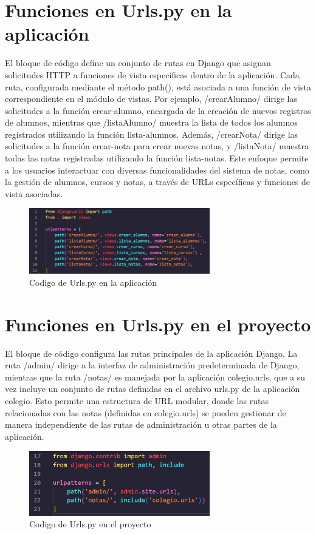 \documentclass[10pt, a4paper]{article}
\begin{document}
\section{Funciones en Urls.py en la aplicación}
El bloque de código define un conjunto de rutas en Django que asignan solicitudes HTTP a funciones de vista específicas dentro de la aplicación. Cada ruta, configurada mediante el método path(), está asociada a una función de vista correspondiente en el módulo de vistas. Por ejemplo, /crearAlumno/ dirige las solicitudes a la función crear-alumno, encargada de la creación de nuevos registros de alumnos, mientras que /listaAlumno/ muestra la lista de todos los alumnos registrados utilizando la función lista-alumnos. Además, /crearNota/ dirige las solicitudes a la función crear-nota para crear nuevas notas, y /listaNota/ muestra todas las notas registradas utilizando la función lista-notas. Este enfoque permite a los usuarios interactuar con diversas funcionalidades del sistema de notas, como la gestión de alumnos, cursos y notas, a través de URLs específicas y funciones de vista asociadas.
\begin{figure}[H]
  \centering
  \includegraphics[width=0.7\textwidth]{img/imagen5.jpeg}
  \caption{Codigo de Urls.py en la aplicación}
\end{figure} 

\section{Funciones en Urls.py en el proyecto}
El bloque de código configura las rutas principales de la aplicación Django. La ruta /admin/ dirige a la interfaz de administración predeterminada de Django, mientras que la ruta /notas/ es manejada por la aplicación colegio.urls, que a su vez incluye un conjunto de rutas definidas en el archivo urls.py de la aplicación colegio. Esto permite una estructura de URL modular, donde las rutas relacionadas con las notas (definidas en colegio.urls) se pueden gestionar de manera independiente de las rutas de administración u otras partes de la aplicación.
\begin{figure}[H]
  \centering
  \includegraphics[width=0.7\textwidth]{img/imagen6.jpeg}
  \caption{Codigo de Urls.py en el proyecto}
\end{figure} 
\end{document}
